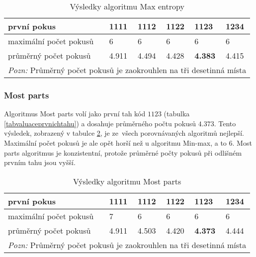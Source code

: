 \begin{table}[h]
\centering
\begin{tabular}{l l l l l l}
\toprule
první pokus & 1111 & 1112 & 1122 & 1123 & \textbf{1234} \\
\midrule

maximální počet pokusů 
& 6 & 6 & 6 & 6 & 6 \\

průměrný počet pokusů 
& 4.911 & 4.494 & 4.428 & \textbf{4.383} & 4.415 \\
\bottomrule
\multicolumn{6}{l}{\footnotesize \textit{Pozn:}
Průměrný počet pokusů je zaokrouhlen na tři desetinná místa}
\end{tabular}
\caption{Výsledky algoritmu Max entropy}\label{tabentropievysl}
\end{table}



\subsubsection{Most parts}
Algoritmus Most parts volí jako první tah kód $1123$ (tabulka \ref{tabvaluaceprvnichtahu}) a dosahuje průměrného počtu pokusů $4.373$. Tento výsledek, zobrazený v tabulce \ref{tabcastivysl}, je ze~všech porovnávaných algoritmů nejlepší. Maximální počet pokusů je ale opět horší než u algoritmu Min-max, a to 6. Most parts algoritmus je konzistentní, protože průměrné počty pokusů při odlišném prvním tahu jsou vyšší.


\begin{table}[h]
\centering
\begin{tabular}{l l l l l l}
\toprule
první pokus & 1111 & 1112 & 1122 & \textbf{1123} & 1234 \\
\midrule

maximální počet pokusů 
& 7 & 6 & 6 & 6 & 6 \\

průměrný počet pokusů 
& 4.911 & 4.503 & 4.420 & \textbf{4.373} & 4.444\\
\bottomrule
\multicolumn{6}{l}{\footnotesize \textit{Pozn:}
Průměrný počet pokusů je zaokrouhlen na tři desetinná místa}
\end{tabular}
\caption{Výsledky algoritmu Most parts}\label{tabcastivysl}
\end{table}


